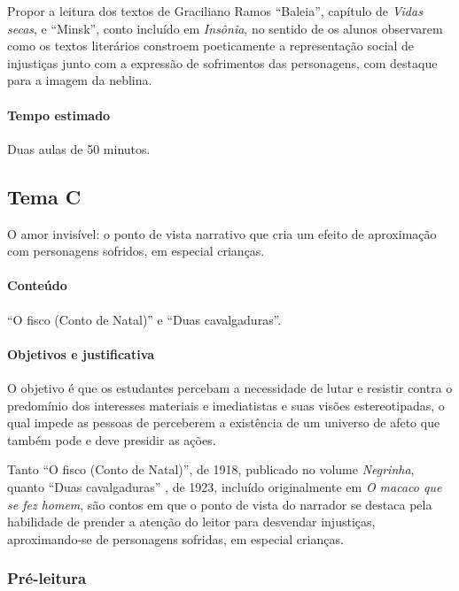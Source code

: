 \documentclass[11pt]{extarticle}
\begin{document}
Propor a leitura dos textos de Graciliano Ramos ``Baleia'', capítulo de
\emph{Vidas secas}, e ``Minsk'', conto incluído em \emph{Insônia}, no
sentido de os alunos observarem como os textos literários constroem
poeticamente a representação social de injustiças junto com a expressão
de sofrimentos das personagens, com destaque para a imagem da neblina.

\paragraph{Tempo estimado} Duas aulas de 50 minutos.

\subsection{Tema C}

O amor invisível: o ponto de vista narrativo que cria um efeito de
aproximação com personagens sofridos, em especial crianças.


\paragraph{Conteúdo} ``O fisco (Conto de Natal)'' e ``Duas cavalgaduras''.

\paragraph{Objetivos e justificativa}
O objetivo é que os estudantes percebam a necessidade de lutar e
resistir contra o predomínio dos interesses materiais e imediatistas e
suas visões estereotipadas, o qual impede as pessoas de perceberem a
existência de um universo de afeto que também pode e deve presidir as
ações.

Tanto ``O fisco (Conto de Natal)'', de 1918, publicado no volume
\emph{Negrinha}, quanto ``Duas cavalgaduras'' , de 1923, incluído
originalmente em \emph{O macaco que se fez homem}, são contos em que o
ponto de vista do narrador se destaca pela habilidade de prender a
atenção do leitor para desvendar injustiças, aproximando-se de
personagens sofridas, em especial crianças.


\subsubsection{Pré-leitura}
\end{document}
